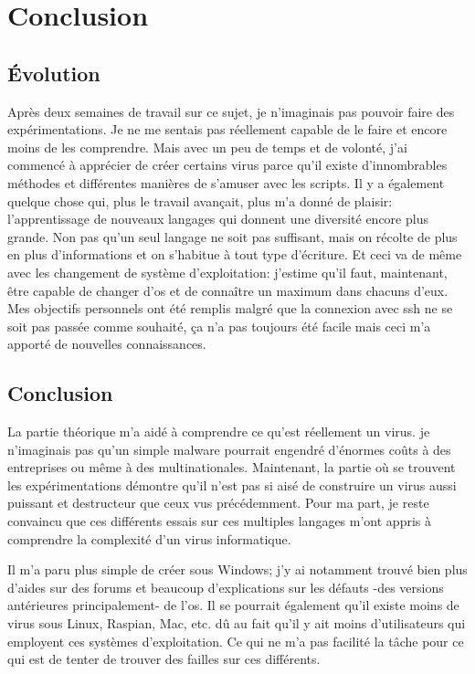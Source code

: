 
\chapter{Conclusion}

\section{Évolution}
Après deux semaines de travail sur ce sujet, je n'imaginais pas pouvoir faire des expérimentations. Je ne me sentais pas réellement capable de le faire et encore moins de les comprendre. Mais avec un peu de temps et de volonté, j'ai commencé à apprécier de créer certains virus parce qu'il existe d'innombrables méthodes et différentes manières de s'amuser avec les scripts. Il y a également quelque chose qui, plus le travail avançait, plus m'a donné de plaisir: l'apprentissage de nouveaux langages qui donnent une diversité encore plus grande. Non pas qu'un seul langage ne soit pas suffisant, mais on récolte de plus en plus d'informations et on s'habitue à tout type d'écriture. Et ceci va de même avec les changement de système d'exploitation: j'estime qu'il faut, maintenant, être capable de changer d'os et de connaître un maximum dans chacuns d'eux. Mes objectifs personnels ont été remplis malgré que la connexion avec ssh ne se soit pas passée comme souhaité, ça n'a pas toujours été facile mais ceci m'a apporté de nouvelles connaissances. 
\section{Conclusion}

La partie théorique m'a aidé à comprendre ce qu'est réellement un virus. je n'imaginais pas qu'un simple malware pourrait engendré d'énormes coûts à des entreprises ou même à des multinationales. Maintenant, la partie où se trouvent les expérimentations démontre qu'il n'est pas si aisé de construire un virus aussi puissant et destructeur que ceux vus précédemment. Pour ma part, je reste convaincu que ces différents essais sur ces multiples langages m'ont appris à comprendre la complexité d'un virus informatique.
 
Il m'a paru plus simple de créer sous Windows; j'y ai notamment trouvé bien plus d'aides sur des forums et beaucoup d'explications sur les défauts -des versions antérieures principalement- de l'os. Il se pourrait également qu'il existe moins de virus sous Linux, Raspian, Mac, etc. dû au fait qu'il y ait moins d'utilisateurs qui employent ces systèmes d'exploitation. Ce qui ne m'a pas facilité la tâche pour ce qui est de tenter de trouver des failles sur ces différents.

